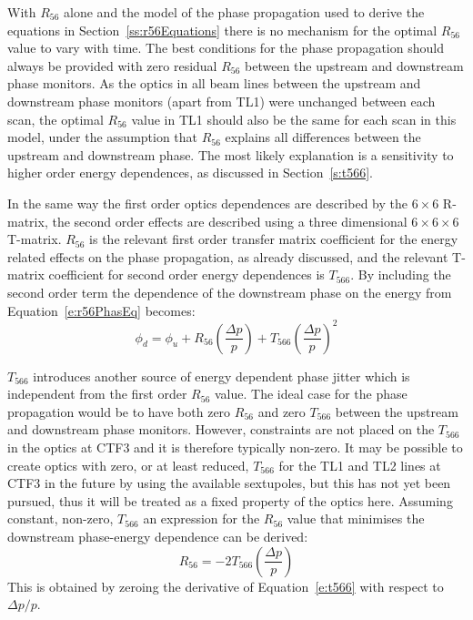 With \(R_{56}\) alone and the model of the phase propagation used to derive the equations in Section~\ref{ss:r56Equations} there is no mechanism for the optimal \(R_{56}\) value to vary with time. The best conditions for the phase propagation should always be provided with zero residual \(R_{56}\) between the upstream and downstream phase monitors. As the optics in all beam lines between the upstream and downstream phase monitors (apart from TL1) were unchanged between each scan, the optimal \(R_{56}\) value in TL1 should also be the same for each scan in this model, under the assumption that \(R_{56}\) explains all differences between the upstream and downstream phase. The most likely explanation is a sensitivity to higher order energy dependences, as discussed in Section~\ref{s:t566}.


In the same way the first order optics dependences are described by the \(6 \times 6\) R-matrix, the second order effects are described using a three dimensional \(6 \times 6 \times 6\) T-matrix. \linebreak \(R_{56}\) is the relevant first order transfer matrix coefficient for the energy related effects on the phase propagation, as already discussed, and the relevant T-matrix coefficient for second order energy dependences is \(T_{566}\). By including the second order term the dependence of the downstream phase on the energy from Equation~\ref{e:r56PhasEq} becomes:
\begin{equation}
\phi_d = \phi_u + R_{56}\left(\frac{\Delta p}{p}\right) + T_{566}\left(\frac{\Delta p}{p}\right)^2
\label{e:t566}
\end{equation}

\(T_{566}\) introduces another source of energy dependent phase jitter which is independent from the first order \(R_{56}\) value. The ideal case for the phase propagation would be to have both zero \(R_{56}\) and zero \(T_{566}\) between the upstream and downstream phase monitors. However, constraints are not placed on the \(T_{566}\) in the optics at CTF3 and it is therefore typically non-zero. It may be possible to create optics with zero, or at least reduced, \(T_{566}\) for the TL1 and TL2 lines at CTF3 in the future by using the available sextupoles, but this has not yet been pursued, thus it will be treated as a fixed property of the optics here. Assuming constant, non-zero, \(T_{566}\) an expression for the \(R_{56}\) value that minimises the downstream phase-energy dependence can be derived:
\begin{equation}
R_{56} = -2T_{566} \left(\frac{\Delta p}{p}\right)
\label{e:r56t566dep}
\end{equation}
This is obtained by zeroing the derivative of Equation~\ref{e:t566} with respect to \(\Delta p/p\).

